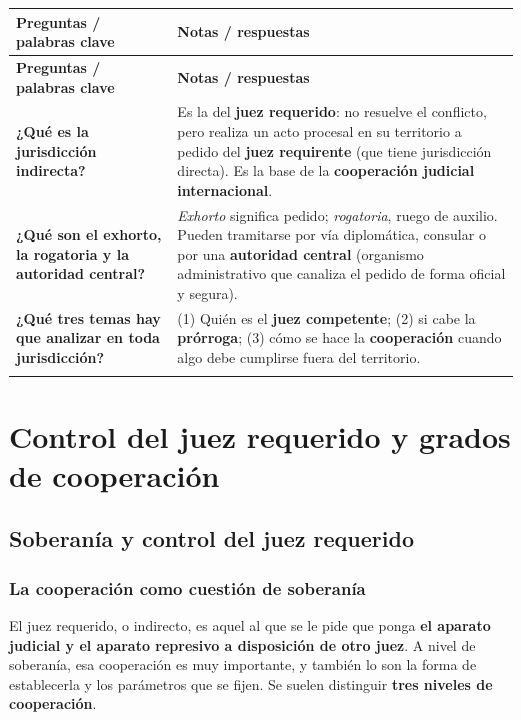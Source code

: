 \documentclass[12pt,oneside]{book}
\makeatletter
\newenvironment{cornell}{%
    \begin{longtable}{@{}>{\raggedright\arraybackslash}p{0.28\textwidth}>{\raggedright\arraybackslash}p{0.67\textwidth}@{}}
    \toprule
    \textbf{Preguntas / palabras clave} & \textbf{Notas / respuestas} \\
    \midrule
    \endfirsthead
    \toprule
    \textbf{Preguntas / palabras clave} & \textbf{Notas / respuestas} \\
    \midrule
    \endhead
}{%
    \end{longtable}
}
\newcommand{\cornellrow}[2]{\textbf{#1} & #2 \\[0.6em]}
\newcommand{\cornellresumen}[1]{%
    \midrule
    \multicolumn{2}{@{}p{\dimexpr0.95\textwidth+2\tabcolsep\relax}@{}}{\textbf{Resumen:} #1} \\
    \bottomrule
}
\makeatother
\begin{document}
\begin{cornell}
\cornellrow{¿Qué es la jurisdicción indirecta?}{Es la del \textbf{juez requerido}: no resuelve el conflicto, pero realiza un acto procesal en su territorio a pedido del \textbf{juez requirente} (que tiene jurisdicción directa). Es la base de la \textbf{cooperación judicial internacional}.}
\cornellrow{¿Qué son el exhorto, la rogatoria y la autoridad central?}{\textit{Exhorto} significa pedido; \textit{rogatoria}, ruego de auxilio. Pueden tramitarse por vía diplomática, consular o por una \textbf{autoridad central} (organismo administrativo que canaliza el pedido de forma oficial y segura).}
\cornellrow{¿Qué tres temas hay que analizar en toda jurisdicción?}{(1) Quién es el \textbf{juez competente}; (2) si cabe la \textbf{prórroga}; (3) cómo se hace la \textbf{cooperación} cuando algo debe cumplirse fuera del territorio.}
\cornellresumen{La jurisdicción indirecta es la del juez requerido, que realiza un acto procesal en su territorio a pedido del juez requirente. El pedido, llamado exhorto o rogatoria, puede transitar por vía diplomática, consular o por una autoridad central. Toda jurisdicción debe analizarse en tres ejes: juez competente, prórroga y cooperación.}
\end{cornell}

\chapter[Control del juez requerido y grados de cooperación]{Control del juez requerido y grados de cooperación}

\section{Soberanía y control del juez requerido}

\subsection{La cooperación como cuestión de soberanía}

El juez requerido, o indirecto, es aquel al que se le pide que ponga \textbf{el aparato judicial y el aparato represivo a disposición de otro juez}. A nivel de soberanía, esa cooperación es muy importante, y también lo son la forma de establecerla y los parámetros que se fijen. Se suelen distinguir \textbf{tres niveles de cooperación}.
\end{document}
